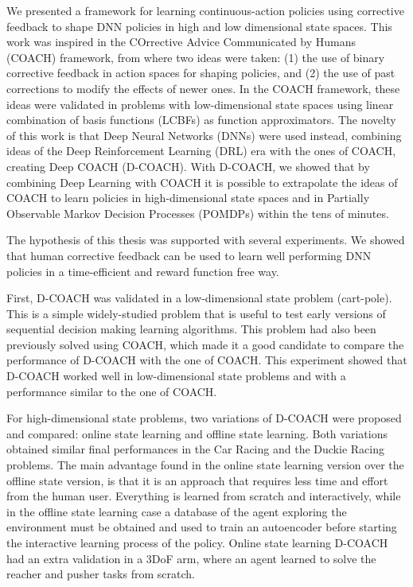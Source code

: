 \begin{conclusion}
We presented a framework for learning continuous-action policies using corrective feedback to shape DNN policies in high and low dimensional state spaces. This work was inspired in the COrrective Advice Communicated by Humans (COACH) framework, from where two ideas were taken: (1) the use of binary corrective feedback in action spaces for shaping policies, and (2) the use of past corrections to modify the effects of newer ones. In the COACH framework, these ideas were validated in problems with low-dimensional state spaces using linear combination of basis functions (LCBFs) as function approximators. The novelty of this work is that Deep Neural Networks (DNNs) were used instead, combining ideas of the Deep Reinforcement Learning (DRL) era with the ones of COACH, creating Deep COACH (D-COACH). With D-COACH, we showed that by combining Deep Learning with COACH it is possible to extrapolate the ideas of COACH to learn policies in high-dimensional state spaces and in Partially Observable Markov Decision Processes (POMDPs) within the tens of minutes. 

The hypothesis of this thesis was supported with several experiments. We showed that human corrective feedback can be used to learn well performing DNN policies in a time-efficient and reward function free way.

First, D-COACH was validated in a low-dimensional state problem (cart-pole). This is a simple widely-studied problem that is useful to test early versions of sequential decision making learning algorithms. This problem had also been previously solved using COACH, which made it a good candidate to compare the performance of D-COACH with the one of COACH. This experiment showed that D-COACH worked well in low-dimensional state problems and with a performance similar to the one of COACH. 

For high-dimensional state problems, two variations of D-COACH were proposed and compared: online state learning and offline state learning. Both variations obtained similar final performances in the Car Racing and the Duckie Racing problems. The main advantage found in the online state learning version over the offline state version, is that it is an approach that requires less time and effort from the human user. Everything is learned from scratch and interactively, while in the offline state learning case a database of the agent exploring the environment must be obtained and used to train an autoencoder before starting the interactive learning process of the policy. Online state learning D-COACH had an extra validation in a 3DoF arm, where an agent learned to solve the reacher and pusher tasks from scratch.


\end{conclusion}
